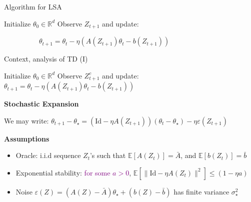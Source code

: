 \documentclass[aspectratio=169,14pt]{beamer}
\begin{document}
\begin{frame}{Algorithm for LSA}
  \begin{algorithmic}
    \State Initialize $\theta_0 \in \mathbb{R}^d$
    \State Observe $Z_{t+1}$ and update:
    \begin{center}
      ~~~~~~~~~~$\theta_{t+1} = \theta_{t} - \eta( A(Z_{t+1}) \theta_{t} - b(Z_{t+1}))$
    \end{center}
    \EndFor
  \end{algorithmic}  
  
\end{frame}

\begin{frame}{Context, analysis of TD (I) }
  
  {\tiny
    \begin{algorithmic}
      \State Initialize $\theta_0 \in \mathbb{R}^d$
      \State Observe $Z^c_{t+1}$ and update: $\theta_{t+1} = \theta_{t} - \eta( A(Z_{t+1}) \theta_{t} - b(Z_{t+1}))$
      \EndFor
    \end{algorithmic}
  }

  \pause
  \vspace{-0.5em}
  
  \textbf{Stochastic Expansion}

  \vspace{-0.5em}

  We may write: $\theta_{t+1} - \theta_\star = (\text{Id} - \eta A(Z_{t+1}))(\theta_{t} - \theta_\star) - \eta \varepsilon(Z_{t+1})$  

  \pause
  
  \textbf{Assumptions}

  \vspace{-0.5em}
  
  \begin{itemize}\setlength{\itemindent}{-1em}
    \small
  \item Oracle: i.i.d sequence $Z_{t}$'s such that
    $\mathbb{E} [A(Z_{t})] = \bar{A}$, and
    $\mathbb{E} [b(Z_{t})] = \bar{b}$

    \vspace{0.2em}
    
  \item Exponential stability: \textcolor{purple}{for some $a > 0$}, $\mathbb{E}[ \| \text{Id} - \eta A(Z_t) \|^2 ] \le (1 - \eta a)$ 

    \vspace{0.2em}

  \item Noise $\varepsilon(Z) = (A(Z) - \bar{A}) \theta_\star + (b(Z) - \bar{b})$ has finite variance $\sigma_\star^2$
  \end{itemize}

  \vspace{1em}


\end{frame}
\end{document}
